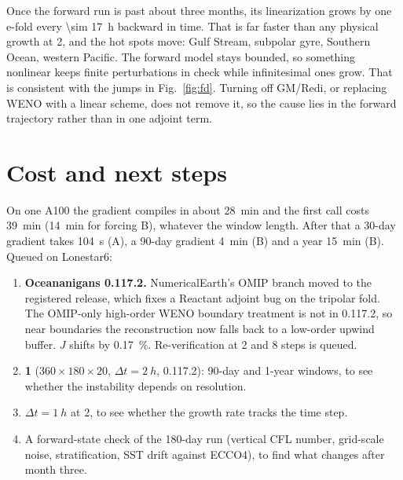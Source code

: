 \documentclass[10pt]{article}
\begin{document}
Once the forward run is past about three months, its linearization grows by one e-fold every
\SI{\sim 17}{h} backward in time. That is far faster than any physical growth at 2\textdegree, and the hot spots
move: Gulf Stream, subpolar gyre, Southern Ocean, western Pacific. The forward model stays bounded, so
something nonlinear keeps finite perturbations in check while infinitesimal ones grow. That is consistent with
the jumps in Fig.~\ref{fig:fd}. Turning off GM/Redi, or replacing WENO with a linear scheme, does not remove it, so
the cause lies in the forward trajectory rather than in one adjoint term.

\section*{Cost and next steps}

On one A100 the gradient compiles in about \SI{28}{min} and the first call costs \SI{39}{min} (\SI{14}{min} for
forcing B), whatever the window length. After that a 30-day gradient takes \SI{104}{s} (A), a 90-day gradient
\SI{4}{min} (B) and a year \SI{15}{min} (B). Queued on Lonestar6:
\begin{enumerate}
  \item \textbf{Oceananigans 0.117.2.} NumericalEarth's OMIP branch moved to the registered release, which fixes a
        Reactant adjoint bug on the tripolar fold. The OMIP-only high-order WENO boundary treatment is not in
        0.117.2, so near boundaries the reconstruction now falls back to a low-order upwind buffer. $J$ shifts by
        \SI{0.17}{\percent}. Re-verification at 2 and 8 steps is queued.
  \item \textbf{1\textdegree{}} ($360\times180\times20$, $\Delta t = \SI{2}{h}$, 0.117.2): 90-day and 1-year windows, to see
        whether the instability depends on resolution.
  \item $\Delta t = \SI{1}{h}$ at 2\textdegree{}, to see whether the growth rate tracks the time step.
  \item A forward-state check of the 180-day run (vertical CFL number, grid-scale noise, stratification, SST
        drift against ECCO4), to find what changes after month three.
\end{enumerate}
\end{document}
